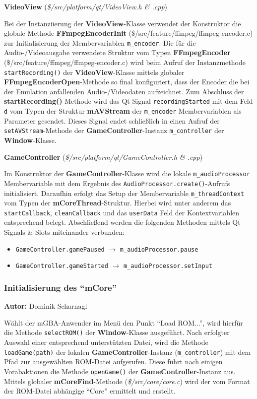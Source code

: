 \documentclass[11pt,a4paper]{scrartcl}
\newcommand{\AutorDominik} {
    \vspace{-4mm}
    \large \textbf{Autor:} Dominik Scharnagl \normalsize
    \vspace{2mm}
}
\newcommand{\paratitlecode}[2] {
    \vspace{5mm}
    \large \textbf{#1} \normalsize(\textit{\${#2}})
    \vspace{2mm}\newline
}
\begin{document}
\paratitlecode{VideoView}{/src/platform/qt/VideoView.h \& .cpp}
Bei der Instanziierung der \textbf{VideoView}-Klasse verwendet der Konstruktor die globale Methode \textbf{FFmpegEncoderInit} (\$/src/feature/ffmpeg/ffmpeg-encoder.c) zur Initialisierung der Membervariablen \verb|m_encoder|. Die f\"ur die Audio-/Videoausgabe verwendete Struktur vom Typen \textbf{FFmpegEncoder} (\$/src/feature/ffmpeg/ffmpeg-encoder.c) wird beim Aufruf der Instanzmethode \verb|startRecording()| der \textbf{VideoView}-Klasse mittels globaler \textbf{FFmpegEncoderOpen}-Methode so final konfiguriert, dass der Encoder die bei der Emulation anfallenden Audio-/Videodaten aufzeichnet. Zum Abschluss der \textbf{startRecording()}-Methode wird das Qt Signal \verb|recordingStarted| mit dem Feld \verb|d| vom Typen der Struktur \textbf{mAVStream} der \verb|m_encoder| Membervariablen als Parameter gesendet. Dieses Signal endet schlie{\ss}lich in einen Aufruf der \verb|setAVStream|-Methode der \textbf{GameController}-Instanz \verb|m_controller| der \textbf{Window}-Klasse.


\paratitlecode{GameController}{/src/platform/qt/GameController.h \& .cpp}
Im Konstruktor der \textbf{GameController}-Klasse wird die lokale \verb|m_audioProcessor| Membervariable mit dem Ergebnis des \verb|AudioProcessor.create()|-Aufrufs initialisiert. Daraufhin erfolgt das Setup der Membervariable \verb|m_threadContext| vom Typen der \textbf{mCoreThread}-Struktur. Hierbei wird unter anderem das \verb|startCallback|, \verb|cleanCallback| und das \verb|userData| Feld der Kontextvariablen entsprechend belegt. Abschlie{\ss}end werden die folgenden Methoden mittels Qt Signals \& Slots miteinander verbunden:

\begin{itemize}
    \item \verb|GameController.gamePaused| $\rightarrow$ \verb|m_audioProcessor.pause|
    \item \verb|GameController.gameStarted| $\rightarrow$ \verb|m_audioProcessor.setInput|
\end{itemize}

\newpage
\subsubsection{Initialisierung des \enquote{mCore}}
\AutorDominik

W\"ahlt der mGBA-Anwender im Men\"u den Punkt \enquote{Load ROM...}, wird hierf\"ur die Methode \verb|selectROM()| der \textbf{Window}-Klasse ausgef\"uhrt. Nach erfolgter Auswahl einer entsprechend unterst\"utzten Datei, wird die Methode \verb|loadGame(path)|  der lokalen \textbf{GameController}-Instanz (\verb|m_controller|) mit dem Pfad zur ausgew\"ahlten ROM-Datei aufgerufen. Diese f\"uhrt nach einigen Vorabaktionen die Methode \verb|openGame()| der \textbf{GameController}-Instanz aus. Mittels globaler \textbf{mCoreFind}-Methode (\textit{\$/src/core/core.c}) wird der vom Format der ROM-Datei abh\"angige \enquote{Core} ermittelt und erstellt.
\end{document}
